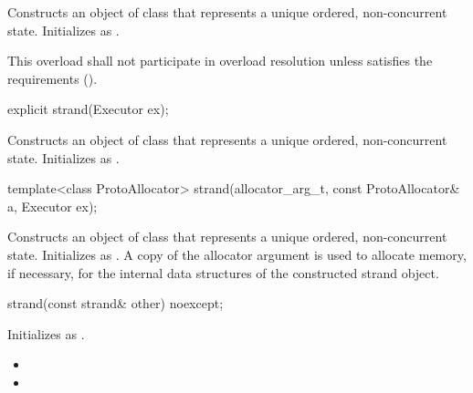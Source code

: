 \begin{itemdescr}
\pnum
\effects Constructs an object of class  that represents a unique ordered, non-concurrent state. Initializes  as .

\pnum
\remarks This overload shall not participate in overload resolution unless  satisfies the  requirements ().
\end{itemdescr}

\begin{itemdecl}
explicit strand(Executor ex);
\end{itemdecl}

\begin{itemdescr}
\pnum
\effects Constructs an object of class  that represents a unique ordered, non-concurrent state. Initializes  as .
\end{itemdescr}

\begin{itemdecl}
template<class ProtoAllocator>
  strand(allocator_arg_t, const ProtoAllocator& a, Executor ex);
\end{itemdecl}

\begin{itemdescr}
\pnum
\effects Constructs an object of class  that represents a unique ordered, non-concurrent state. Initializes  as . A copy of the allocator argument  is used to allocate memory, if necessary, for the internal data structures of the constructed strand object.
\end{itemdescr}

\begin{itemdecl}
strand(const strand& other) noexcept;
\end{itemdecl}

\begin{itemdescr}
\pnum
\effects Initializes  as .

\pnum
\postconditions 
\begin{itemize}
\item
{}
\item
{}
\end{itemize}
\end{itemdescr}

